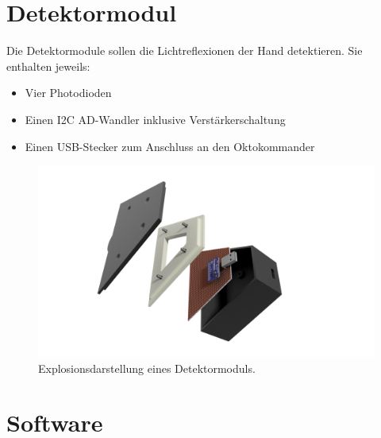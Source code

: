\documentclass{sciposter}
\begin{document}
\begin{multicols}{3}

\section{Detektormodul}
\noindent
Die Detektormodule sollen die Lichtreflexionen der Hand detektieren. Sie enthalten jeweils:
\begin{itemize}
	\item Vier Photodioden 
	\item Einen I2C AD-Wandler inklusive Verstärkerschaltung
	\item Einen USB-Stecker zum Anschluss an den Oktokommander
\end{itemize}

\begin{figure}[h]
	\centering
	\includegraphics[scale=0.5]{../CAD_Bilder/Detektormodul/Detektormodul_raytraced.png}
	\caption{Explosionsdarstellung eines Detektormoduls.}
	\label{fig:Detektormodul}
\end{figure}


\section{Software}


\end{multicols}
\end{document}
